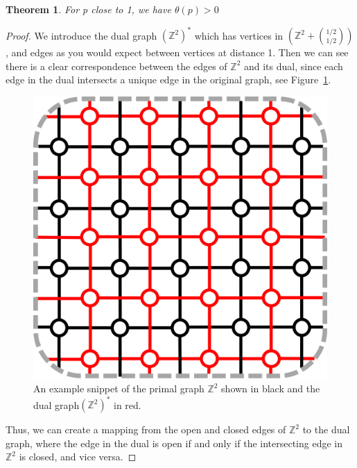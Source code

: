 \documentclass[a4paper,11pt]{article}
\newtheorem{theorem}{Theorem}[section]
\theoremstyle{definition}
\newcommand{\ints}{\mathbb{Z}}
\begin{document}
\begin{theorem}
	For p close to 1, we have $\theta(p) > 0$
\end{theorem}
\begin{proof}
	We introduce the dual graph $(\ints^2)^*$ which has vertices in $(\ints^2 + \binom{1/2}{1/2} )$, and edges as you would expect between vertices at distance 1.
	Then we can see there is a clear correspondence between the edges of $\ints^2$ and its dual, since each edge in the dual intersects a unique edge in the original graph, see Figure~\ref*{fig:dualGraph}. 

	\begin{figure}
		\centering
		\includegraphics[scale=0.6]{drawings/dualGraph.png}
		\caption{An example snippet of the primal graph $\ints^2$ shown in black and the dual graph$(\ints^2)^*$  in red.}
		\label{fig:dualGraph}
	\end{figure}

	Thus, we can create a mapping from the open and closed edges of $\ints^2$ to the dual graph, where the edge in the dual is open if and only if the intersecting edge in $\ints^2$ is closed, and vice versa.


\end{proof}
\end{document}

